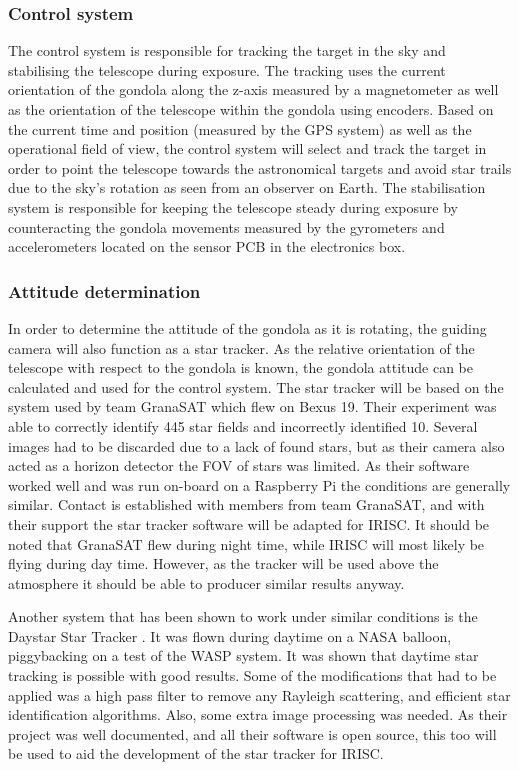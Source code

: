 
\subsubsection{Control system}
The control system is responsible for tracking the target in the sky and stabilising the telescope during exposure. The tracking uses the current orientation of the gondola along the z-axis measured by a magnetometer as well as the orientation of the telescope within the gondola using encoders. Based on the current time and position (measured by the GPS system) as well as the operational field of view, the control system will select and track the target in order to point the telescope towards the astronomical targets and avoid star trails due to the sky's rotation as seen from an observer on Earth. The stabilisation system is responsible for keeping the telescope steady during exposure by counteracting the gondola movements measured by the gyrometers and accelerometers located on the sensor PCB in the electronics box.


\subsubsection{Attitude determination}
In order to determine the attitude of the gondola as it is rotating, the guiding camera will also function as a star tracker. As the relative orientation of the telescope with respect to the gondola is known, the gondola attitude can be calculated and used for the control system. The star tracker will be based on the system used by team GranaSAT which flew on Bexus 19. Their experiment was able to correctly identify 445 star fields and incorrectly identified 10. Several images had to be discarded due to a lack of found stars, but as their camera also acted as a horizon detector the FOV of stars was limited. As their software worked well and was run on-board on a Raspberry Pi the conditions are generally similar. Contact is established with members from team GranaSAT, and with their support the star tracker software will be adapted for IRISC. It should be noted that GranaSAT flew during night time, while IRISC will most likely be flying during day time. However, as the tracker will be used above the atmosphere it should be able to producer similar results anyway.

Another system that has been shown to work under similar conditions is the Daystar Star Tracker \mbox{\cite{daystar}}. It was flown during daytime on a NASA balloon, piggybacking on a test of the WASP system. It was shown that daytime star tracking is possible with good results. Some of the modifications that had to be applied was a high pass filter to remove any Rayleigh scattering, and efficient star identification algorithms. Also, some extra image processing was needed. As their project was well documented, and all their software is open source, this too will be used to aid the development of the star tracker for IRISC.



